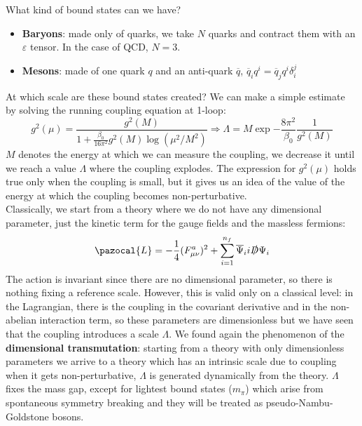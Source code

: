 \documentclass[../main.tex]{subfiles}
\begin{document}
What kind of bound states can we have?
\begin{itemize}
    \item \textbf{Baryons}: made only of quarks, we take $N$ quarks and contract them with an $\varepsilon$ tensor. In the case of QCD, $N=3$.
    \item \textbf{Mesons}: made of one quark $q$ and an anti-quark $\overline{q}$, $\overline{q}_iq^i=\overline{q}_jq^i\delta_i^j$
\end{itemize}
At which scale are these bound states created? We can make a simple estimate by solving the running coupling equation at 1-loop:
\[
g^2(\mu)=\frac{g^2(M)}{1+\frac{\beta_0}{16\pi^2}g^2(M)\log(\mu^2/M^2)}\Rightarrow\Lambda=M\exp{-\frac{8\pi^2}{\beta_0}\frac{1}{g^2(M)}}
\]
$M$ denotes the energy at which we can measure the coupling, we decrease it until we reach a value $\Lambda$ where the coupling explodes. The expression for $g^2(\mu)$ holds true only when the coupling is small, but it gives us an idea of the value of the energy at which the coupling becomes non-perturbative.\\
Classically, we start from a theory where we do not have any dimensional parameter, just the kinetic term for the gauge fields and the massless fermions:
\[
\pazocal{L}=-\frac{1}{4}(F_{\mu\nu}^a)^2+\sum_{i=1}^{n_f}\overline{\Psi}_ii\slashed{D}\Psi_i
\]
The action is invariant since there are no dimensional parameter, so there is nothing fixing a reference scale. However, this is valid only on a classical level: in the Lagrangian, there is the coupling in the covariant derivative and in the non-abelian interaction term, so these parameters are dimensionless but we have seen that the coupling introduces a scale $\Lambda$. We found again the phenomenon of the \textbf{dimensional transmutation}: starting from a theory with only dimensionless parameters we arrive to a theory which has an intrinsic scale due to coupling when it gets non-perturbative, $\Lambda$ is generated dynamically from the theory. $\Lambda$ fixes the mass gap, except for lightest bound states ($m_\pi$) which arise from spontaneous symmetry breaking and they will be treated as pseudo-Nambu-Goldstone bosons.\\
\end{document}
